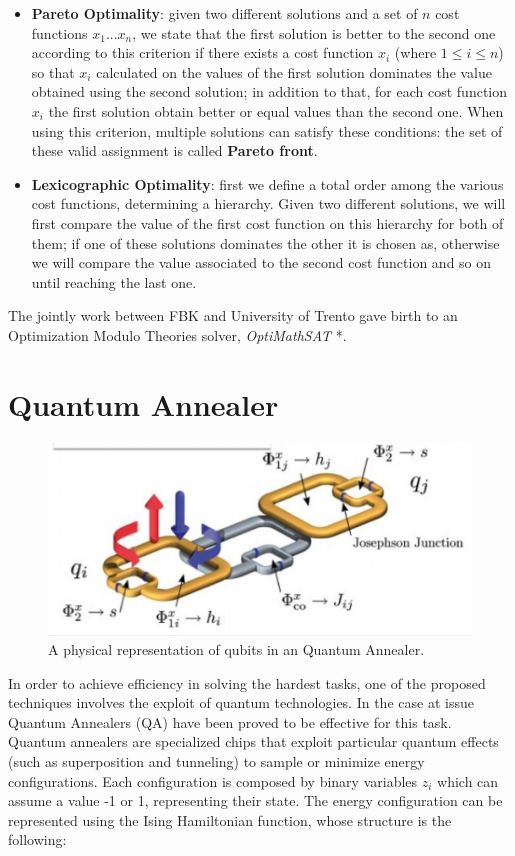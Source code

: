 \begin{itemize}
    \item \textbf{Pareto Optimality}: given two different solutions and a set of $n$ cost functions $x_1...x_n$, we state that the first solution is better to the second one according to this criterion if there exists a cost function $x_i$ (where $1\leq i\leq n$) so that $x_i$ calculated on the values of the first solution dominates the value obtained using the second solution; in addition to that, for each cost function $x_i$ the first solution obtain better or equal values than the second one. When using this criterion, multiple solutions can satisfy these conditions: the set of these valid assignment is called \textbf{Pareto front}.
    \item \textbf{Lexicographic Optimality}: first we define a total order among the various cost functions, determining  a hierarchy. Given two different solutions, we will first compare the value of the first cost function on this hierarchy for both of them; if one of these solutions dominates the other it is chosen as, otherwise we will compare the value associated to the second cost function and so on until reaching the last one.
\end{itemize}

The jointly work between FBK and University of Trento gave birth to an Optimization Modulo Theories solver, \textit{OptiMathSAT} \cite{pa25}*.

\section{Quantum Annealer}
\label{sec:quantum}

\begin{figure}[t]
	\begin{center}
	\includegraphics{images/QA.PNG}
	\caption{A physical representation of qubits in an Quantum Annealer.}
	\end{center}
\end{figure}
In order to achieve efficiency in solving the hardest tasks, one of the proposed techniques involves the exploit of quantum technologies. In the case at issue Quantum Annealers (QA) have been proved to be effective for this task. \\
Quantum annealers are specialized chips that exploit particular quantum effects (such as superposition and tunneling) to sample or minimize energy configurations. Each configuration is composed by binary variables $z_i$ which can assume a value -1 or 1, representing their state. The energy configuration can be represented using the Ising Hamiltonian function, whose structure is the following:

